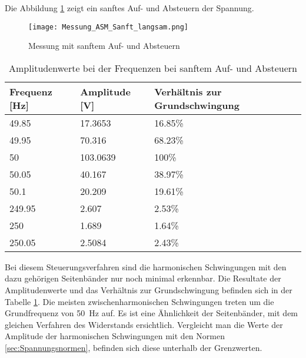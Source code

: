 Die Abbildung \ref{fig:Mess_ASM_Sanft_langsam} zeigt ein sanftes Auf- und Absteuern der Spannung.

\begin{figure}[ht!]
	\centering
	\texttt{[image: Messung\_ASM\_Sanft\_langsam.png]}	
	\caption{Messung mit sanftem Auf- und Absteuern}\label{fig:Mess_ASM_Sanft_langsam}
\end{figure}


\begin{table}[ht!]
	\centering
	\begin{tabular}{|l|l|l|}
		\hline
		Frequenz {[}Hz{]} & Amplitude {[}V{]} & Verhältnis zur Grundschwingung \\ \hline
		49.85             & 17.3653           & 16.85\%                        \\ \hline
		49.95             & 70.316            & 68.23\%                        \\ \hline
		50                & 103.0639          & 100\%                          \\ \hline
		50.05             & 40.167            & 38.97\%                        \\ \hline
		50.1              & 20.209            & 19.61\%                        \\ \hline
		249.95            & 2.607             & 2.53\%                         \\ \hline
		250               & 1.689             & 1.64\%                         \\ \hline
		250.05            & 2.5084            & 2.43\%                         \\ \hline
	\end{tabular}
\caption{Amplitudenwerte bei der Frequenzen bei sanftem Auf- und Absteuern}\label{tab:Mess_Spannung_ASM_AufAb_sanft}
\end{table}


Bei diesem Steuerungsverfahren sind die harmonischen Schwingungen mit den dazu gehörigen Seitenbänder nur noch minimal erkennbar. Die Resultate der Amplitudenwerte und das Verhältnis zur Grundschwingung befinden sich in der Tabelle \ref{tab:Mess_Spannung_ASM_AufAb_sanft}. Die meisten zwischenharmonischen Schwingungen treten um die Grundfrequenz von \SI{50}{Hz} auf. Es ist eine Ähnlichkeit der Seitenbänder, mit dem gleichen Verfahren des Widerstands ersichtlich. Vergleicht man die Werte der Amplitude der harmonischen Schwingungen mit den Normen \ref{sec:Spannungsnormen}, befinden sich diese unterhalb der Grenzwerten.



